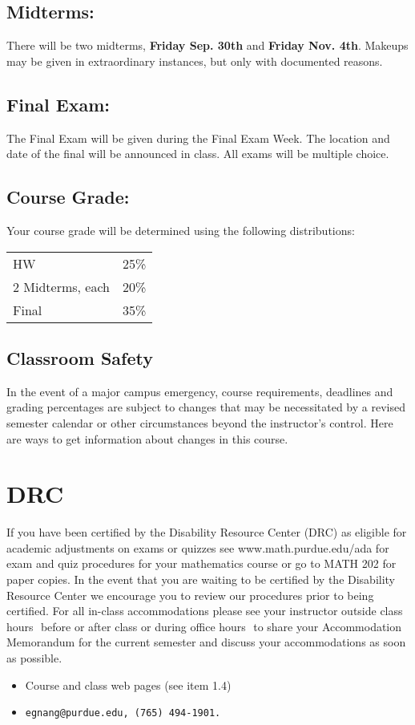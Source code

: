 \documentclass[10pt]{article}
\begin{document}
\subsection{Midterms:}  
	There will be two midterms, {\bf Friday Sep. 30th} and 
  {\bf Friday Nov. 4th}. Makeups may be given in extraordinary
  instances, but only with documented reasons.

\subsection{Final Exam:}
        The Final Exam will be given during the Final Exam Week.
        The location and date of the final will be announced in class.
	All exams will be multiple choice.

\subsection{Course Grade:}
        Your course grade will be determined using the following 
        distributions:

\begin{tabular}{ll}\\
        HW 		&    25\%\\
        2 Midterms, each     &  20\%\\
        Final          &     35\%\\
\end{tabular}


\subsection{Classroom Safety}
In the event of a major campus emergency, course requirements,
deadlines and grading percentages are subject to changes that may be
necessitated by a revised semester calendar or other circumstances
beyond the instructor's control. Here are ways to get information
about changes in this course.

\newpage 

\section{DRC}
 
 If you have been certified by the Disability Resource Center (DRC) as
 eligible for academic adjustments on exams or quizzes see
 www.math.purdue.edu/ada for exam and quiz procedures for your mathematics
course or go to MATH 202 for paper copies.
In the event that you are waiting to be certified by the Disability Resource
Center we encourage you to review our procedures prior to being certified.
For all in-class accommodations please see your instructor outside class
hours ­ before or after class or during office hours ­ to share your
Accommodation Memorandum for the current semester and discuss your
accommodations as soon as possible.


\begin{itemize}
\item Course and class web pages (see item 1.4)
\item \tt{egnang@purdue.edu}, \tt{(765) 494-1901}.
\end{itemize}
\end{document}
